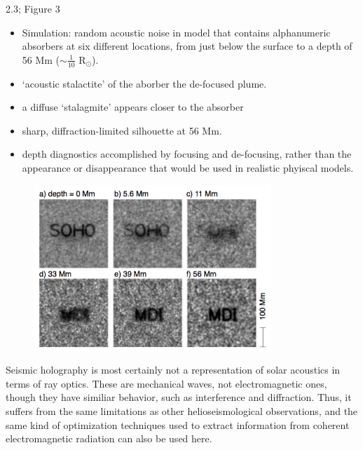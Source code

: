 \documentclass{beamer}
\begin{document}
\begin{frame}{2.3; Figure 3}
    \begin{itemize}
        \item Simulation: random acoustic noise in model that
            contains alphanumeric absorbers at six different locations,
            from just below the surface to a depth of 56 Mm
            ($\sim \frac{1}{10}$ R$_{\odot}$).
        \item `acoustic stalactite' of the aborber \- the de-focused
            plume.
        \item a diffuse `stalagmite' appears closer to the absorber
        \item sharp, diffraction-limited silhouette at 56 Mm.
        \item depth diagnostics accomplished by focusing and
        de-focusing, rather than the appearance or disappearance that
        would be used in realistic phyiscal models.
    \end{itemize}
    \begin{figure}
        \includegraphics[width=0.8\textwidth]{fig_3.png}
    \end{figure}
\end{frame}

\begin{frame}{2.4}
Seismic holography is most certainly not a representation of solar
acoustics in terms of ray optics. These are mechanical waves, not
electromagnetic ones, though they have similiar behavior, such as
interference and diffraction. Thus, it suffers from the same
limitations as other helioseismological observations, and the same
kind of optimization techniques used to extract information from
coherent electromagnetic radiation can also be used here.
\end{frame}
\end{document}
